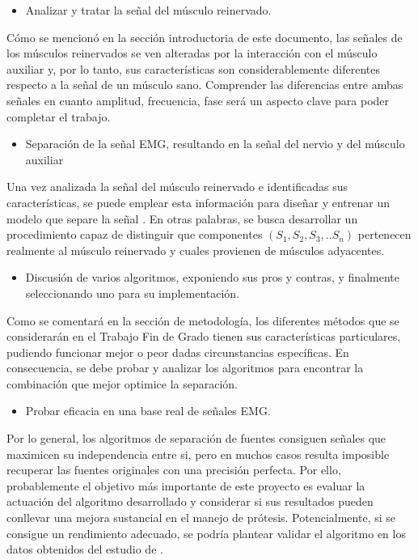 \documentclass[12pt, a4paper]{article}
\begin{document}
\begin{itemize}
    \item Analizar y tratar la señal del músculo reinervado.
 \end{itemize}   
    \noindent Cómo se mencionó en la sección introductoria de este documento, las señales de los músculos reinervados se ven alteradas por la interacción con el músculo auxiliar y, por lo tanto, sus características son considerablemente diferentes respecto a la señal de un músculo sano. Comprender las diferencias entre ambas señales en cuanto amplitud, frecuencia, fase será un aspecto clave para poder completar el trabajo.
\begin{itemize}
    \item Separación de la señal EMG, resultando en la señal del nervio y del músculo auxiliar
\end{itemize}
\noindent Una vez analizada la señal del músculo reinervado e identificadas sus características, se puede emplear esta información para diseñar y entrenar un modelo que separe la señal . En otras palabras, se busca desarrollar un procedimiento capaz de distinguir que componentes $(S_1,S_2,S_3,.. S_n)$ pertenecen realmente al músculo reinervado y cuales provienen de músculos adyacentes.
\begin{itemize}
    \item Discusión de varios algoritmos, exponiendo sus pros y contras, y finalmente seleccionando uno para su implementación.
\end{itemize}
Como se comentará en la sección de metodología, los diferentes métodos que se considerarán en el Trabajo Fin de Grado tienen sus características particulares, pudiendo funcionar mejor o peor dadas circunstancias específicas. En consecuencia, se debe probar y analizar los algoritmos para encontrar la combinación que mejor optimice la separación. 
\begin{itemize}
    \item Probar eficacia en una base real de señales EMG.
\end{itemize}
    \noindent Por lo general, los algoritmos de separación de fuentes consiguen señales que maximicen su independencia entre si, pero en muchos casos resulta imposible recuperar las fuentes originales con una precisión perfecta.  Por ello, probablemente el objetivo más importante de este proyecto es evaluar la actuación del algoritmo desarrollado y considerar si sus resultados pueden conllevar una mejora sustancial en el manejo de prótesis. Potencialmente, si se consigue un rendimiento adecuado, se podría plantear validar el  algoritmo en los datos obtenidos del estudio de \textbf{\textit{\cite{gonzalez-prieto_regenerative_2024}}}.
\end{document}
